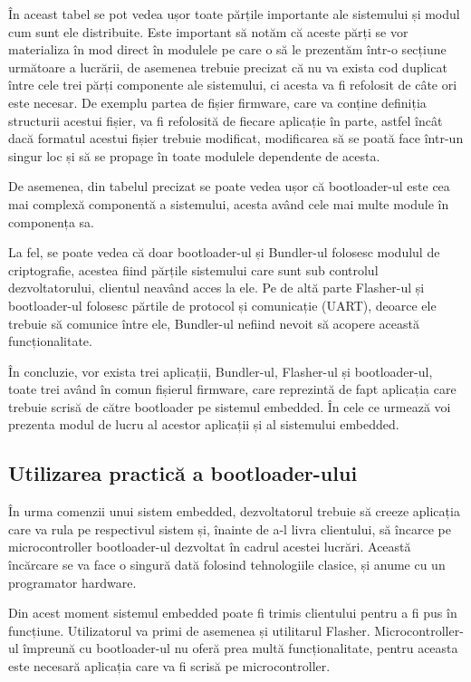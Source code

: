 \documentclass[12pt,a4paper,titlepage]{report}
\begin{document}
În aceast tabel se pot vedea ușor toate părțile importante ale sistemului și modul cum sunt ele distribuite.  Este important să notăm că aceste părți se vor materializa în mod direct în modulele pe care o să le prezentăm într-o secțiune următoare a lucrării, de asemenea trebuie precizat că nu va exista cod duplicat între cele trei părți componente ale sistemului, ci acesta va fi refolosit de câte ori este necesar. De exemplu partea de fișier firmware, care va conține definiția structurii acestui fișier, va fi refolosită de fiecare aplicație în parte, astfel încât dacă formatul acestui fișier trebuie modificat, modificarea să se poată face într-un singur loc și să se propage în toate modulele dependente de acesta.

De asemenea, din tabelul precizat se poate vedea ușor că bootloader-ul este cea mai complexă componentă a sistemului, acesta având cele mai multe module în componența sa.

La fel, se poate vedea că doar bootloader-ul și Bundler-ul folosesc modulul de criptografie, acestea fiind părțile sistemului care sunt sub controlul dezvoltatorului, clientul neavând acces la ele. Pe de altă parte Flasher-ul și bootloader-ul folosesc părtile de protocol și comunicație (UART), deoarce ele trebuie să comunice între ele, Bundler-ul nefiind nevoit să acopere această funcționalitate.

În concluzie, vor exista trei aplicații, Bundler-ul, Flasher-ul și bootloader-ul, toate trei având în comun fișierul firmware, care reprezintă de fapt aplicația care trebuie scrisă de către bootloader pe sistemul embedded. În cele ce urmează voi prezenta modul de lucru al acestor aplicații și al sistemului embedded.

\subsection{Utilizarea practică a bootloader-ului}

În urma comenzii unui sistem embedded, dezvoltatorul trebuie să creeze aplicația care va rula pe respectivul sistem și, înainte de a-l livra clientului, să încarce pe microcontroller bootloader-ul dezvoltat în cadrul acestei lucrări. Această încărcare se va face o singură dată folosind tehnologiile clasice, și anume cu un programator hardware.

Din acest moment sistemul embedded poate fi trimis clientului pentru a fi pus în funcțiune. Utilizatorul va primi de asemenea și utilitarul Flasher. Microcontroller-ul împreună cu bootloader-ul nu oferă prea multă funcționalitate, pentru aceasta este necesară aplicația care va fi scrisă pe microcontroller.
\end{document}
